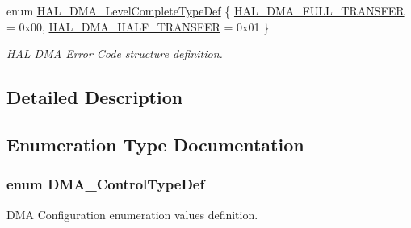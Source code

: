 \begin{DoxyCompactItemize}
enum \hyperlink{group___d_m_a___exported___types_gaee3245eea8fa938edeb35a6c9596fd86}{H\-A\-L\-\_\-\-D\-M\-A\-\_\-\-Level\-Complete\-Type\-Def} \{ \hyperlink{group___d_m_a___exported___types_ggaee3245eea8fa938edeb35a6c9596fd86a5314147c8ba21548763bf89446b78468}{H\-A\-L\-\_\-\-D\-M\-A\-\_\-\-F\-U\-L\-L\-\_\-\-T\-R\-A\-N\-S\-F\-E\-R} = 0x00, 
\hyperlink{group___d_m_a___exported___types_ggaee3245eea8fa938edeb35a6c9596fd86ad0ba8bc74a2ae6dcdc3e316e8be0d5d8}{H\-A\-L\-\_\-\-D\-M\-A\-\_\-\-H\-A\-L\-F\-\_\-\-T\-R\-A\-N\-S\-F\-E\-R} = 0x01
 \}
\begin{DoxyCompactList}\small\item\em H\-A\-L D\-M\-A Error Code structure definition. \end{DoxyCompactList}\end{DoxyCompactItemize}


\subsection{Detailed Description}


\subsection{Enumeration Type Documentation}
\hypertarget{group___d_m_a___exported___types_ga0d2b4c627fbe74a3100d0959afeae2f1}{
\subsubsection[{D\-M\-A\-\_\-\-Control\-Type\-Def}]{\setlength{\rightskip}{0pt plus 5cm}enum {\bf D\-M\-A\-\_\-\-Control\-Type\-Def}}}\label{group___d_m_a___exported___types_ga0d2b4c627fbe74a3100d0959afeae2f1}


D\-M\-A Configuration enumeration values definition. 

